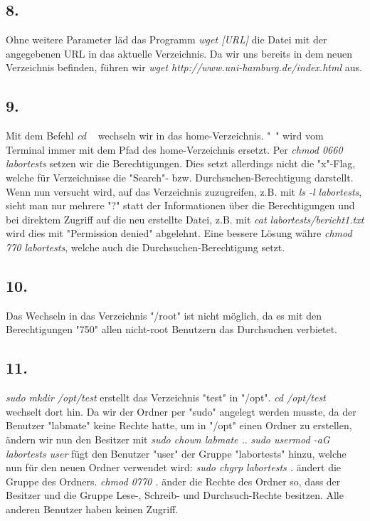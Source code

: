 \documentclass[
    fontsize=12pt,
    headings=small,
    parskip=half,           %
    bibliography=totoc,
    numbers=noenddot,       %
    open=any,               %
    ]{scrreprt}
\begin{document}
\subsection*{8.}
Ohne weitere Parameter läd das Programm \emph{wget [URL]} die Datei mit der angegebenen URL in das aktuelle Verzeichnis. Da wir uns bereits in dem neuen Verzeichnis befinden, führen wir \emph{wget http://www.uni-hamburg.de/index.html} aus.

\subsection*{9.}
Mit dem Befehl \emph{cd ~} wechseln wir in das home-Verzeichnis. "~" wird vom Terminal immer mit dem Pfad des home-Verzeichnis ersetzt. Per \emph{chmod 0660 labortests} setzen wir die Berechtigungen. Dies setzt allerdings nicht die "x"-Flag, welche für Verzeichnisse die "Search"- bzw. Durchsuchen-Berechtigung darstellt. Wenn nun versucht wird, auf das Verzeichnis zuzugreifen, z.B. mit \emph{ls -l labortests}, sieht man nur mehrere "?" statt der Informationen über die Berechtigungen und bei direktem Zugriff auf die neu erstellte Datei, z.B. mit \emph{cat labortests/bericht1.txt} wird dies mit "Permission denied" abgelehnt.
Eine bessere Lösung währe \emph{chmod 770 labortests}, welche auch die Durchsuchen-Berechtigung setzt.

\subsection*{10.}
Das Wechseln in das Verzeichnis "/root" ist nicht möglich, da es mit den Berechtigungen "750" allen nicht-root Benutzern das Durchsuchen verbietet.

\subsection*{11.}
\emph{sudo mkdir /opt/test} erstellt das Verzeichnis "test" in "/opt". \emph{cd /opt/test} wechselt dort hin.
Da wir der Ordner per "sudo" angelegt werden musste, da der Benutzer "labmate" keine Rechte hatte, um in "/opt" einen Ordner zu erstellen, ändern wir nun den Besitzer mit \emph{sudo chown labmate .}.
\emph{sudo usermod -aG labortests user} fügt den Benutzer "user" der Gruppe "labortests" hinzu, welche nun für den neuen Ordner verwendet wird: \emph{sudo chgrp labortests .} ändert die Gruppe des Ordners.
\emph{chmod 0770 .} änder die Rechte des Ordner so, dass der Besitzer und die Gruppe Lese-, Schreib- und Durchsuch-Rechte besitzen. Alle anderen Benutzer haben keinen Zugriff.
\end{document}
